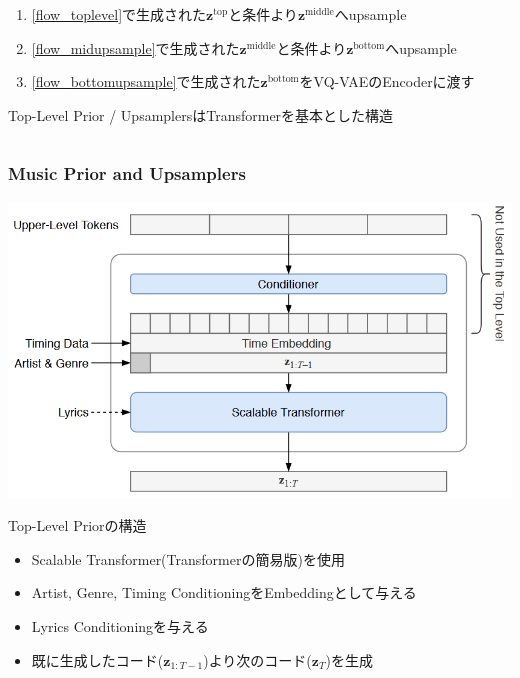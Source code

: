 \documentclass[dvipdfmx]{beamer}
\begin{document}
\begin{frame}
\begin{columns}
\begin{column}[T]{0.50\textwidth}
\begin{enumerate}
                \label{flow_toplevel}
                \item \ref{flow_toplevel}で生成された$\bm{z}^{\mathrm{top}}$と条件より$\bm{z}^{\mathrm{middle}}$へupsample
                \label{flow_midupsample}
                \item \ref{flow_midupsample}で生成された$\bm{z}^{\mathrm{middle}}$と条件より$\bm{z}^{\mathrm{bottom}}$へupsample
                \label{flow_bottomupsample}
                \item \ref{flow_bottomupsample}で生成された$\bm{z}^{\mathrm{bottom}}$をVQ-VAEのEncoderに渡す
            \end{enumerate}
            \vspace{\baselineskip}
            Top-Level Prior / UpsamplersはTransformerを基本とした構造
            \vspace{\fill}
        \end{column}
    \end{columns}
\end{frame}


\begin{frame}
    \frametitle{Music Prior and Upsamplers}
    \begin{center}
        \includegraphics[scale=0.25]{figure/priormodeldetail.png}
    \end{center}
    Top-Level Priorの構造
    \begin{itemize}
        \item Scalable Transformer(Transformerの簡易版)を使用
        \item Artist, Genre, Timing ConditioningをEmbeddingとして与える
        \item Lyrics Conditioningを与える
        \item 既に生成したコード($\bm{z}_{1:T-1}$)より次のコード($\bm{z}_{T}$)を生成
    \end{itemize}
\end{frame}
\end{document}
